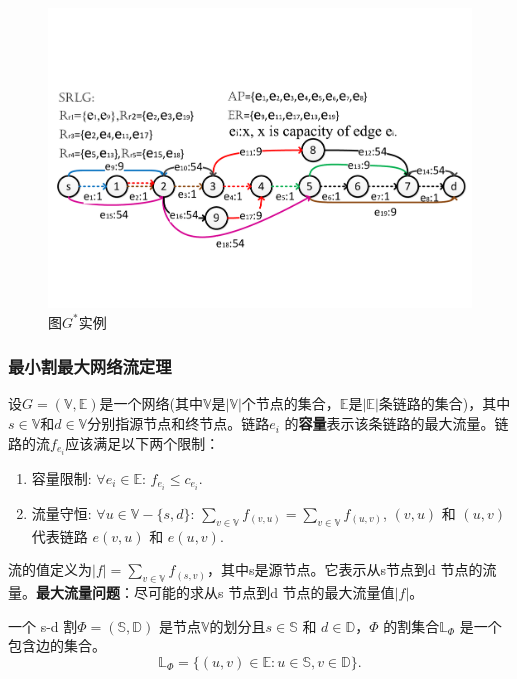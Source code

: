 \begin{figure}[tp]
  \centering
  \includegraphics[width=4.5in]{figures/FlowStarGraph}
  \caption{图$G^*$实例}\label{fig:FlowStarGraph}
\end{figure}



\subsubsection{最小割最大网络流定理}
\label{subsubsec:maxFlow}
设$G=(\mathbb{\mathbb{V}},\mathbb{\mathbb{E}})$是一个网络(其中$\mathbb{\mathbb{V}}$是$|\mathbb{\mathbb{V}}|$个节点的集合，$\mathbb{\mathbb{E}}$是$|\mathbb{\mathbb{E}}|$条链路的集合)，其中$s\in \mathbb{V}$和$d\in \mathbb{V}$分别指源节点和终节点。链路$e_i$ 的\textbf{容量}表示该条链路的最大流量。链路的流$f_{e_i}$应该满足以下两个限制：
\begin{enumerate}
  \item 容量限制: $\forall e_i\in \mathbb{\mathbb{E}}$: $f_{e_i}\leq c_{e_i}$.
  \item 流量守恒: $\forall u\in \mathbb{\mathbb{V}}-\{s,d\}$: $\sum\limits_{v\in \mathbb{V}}f_{(v,u)}=\sum\limits_{v\in \mathbb{V}}f_{(u,v)}$,  $(v,u)$ 和 $(u,v)$ 代表链路 $e(v,u)$ 和 $e(u,v)$.
\end{enumerate}

流的值定义为$|f|=\sum\limits_{v\in \mathbb{V}}f_{(s,v)}$，其中s是源节点。它表示从s节点到d 节点的流量。\textbf{最大流量问题}：尽可能的求从s 节点到d 节点的最大流量值$|f|$。

一个 s-d 割${\Phi}=(\mathbb{S},\mathbb{D})$ 是节点$\mathbb{V}$的划分且$s \in \mathbb{S}$ 和 $d \in \mathbb{D}$，$\Phi$ 的割集合$\mathbb{\mathbb{L}}_{\Phi}$ 是一个包含边的集合。
\begin{equation}
\mathbb{\mathbb{L}}_{\Phi}=\{(u,v)\in \mathbb{E}: u \in \mathbb{S}, v \in \mathbb{D}\}.
\end{equation}


